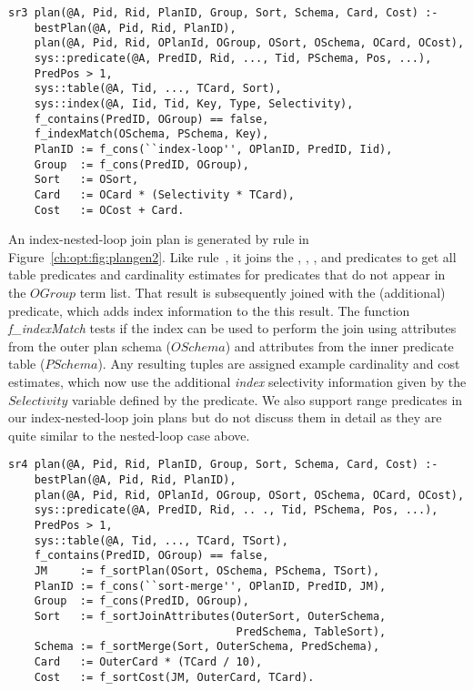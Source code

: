 \begin{figure*}
\ssp
\centering
\begin{lstlisting}
sr3 plan(@A, Pid, Rid, PlanID, Group, Sort, Schema, Card, Cost) :-
    bestPlan(@A, Pid, Rid, PlanID),
    plan(@A, Pid, Rid, OPlanId, OGroup, OSort, OSchema, OCard, OCost),
    sys::predicate(@A, PredID, Rid, ..., Tid, PSchema, Pos, ...),
    PredPos > 1,
    sys::table(@A, Tid, ..., TCard, Sort),
    sys::index(@A, Iid, Tid, Key, Type, Selectivity),
    f_contains(PredID, OGroup) == false,
    f_indexMatch(OSchema, PSchema, Key),
    PlanID := f_cons(``index-loop'', OPlanID, PredID, Iid),
    Group  := f_cons(PredID, OGroup),
    Sort   := OSort,
    Card   := OCard * (Selectivity * TCard),
    Cost   := OCost + Card.
\end{lstlisting}
\caption{\label{ch:opt:fig:plangen2}index-nested-loop join method.}
\end{figure*}

An index-nested-loop join plan is generated by rule  in
Figure~\ref{ch:opt:fig:plangen2}.  Like rule~, it joins the
, , , and  predicates
to get all table predicates and cardinality estimates for predicates that do
not appear in the $OGroup$ term list.  That result is subsequently joined with
the (additional)  predicate, which adds index information to the
this result.  The function {\em f\_indexMatch} tests if the index can be used
to perform the join using attributes from the outer plan schema ($OSchema$) and
attributes from the inner predicate table ($PSchema$).  Any resulting tuples
are assigned example cardinality and cost estimates, which now use the
additional {\em index} selectivity information given by the $Selectivity$
variable defined by the  predicate.  We also support range
predicates in our index-nested-loop join plans but do not discuss them in
detail as they are quite similar to the nested-loop case above.

\begin{figure*}
\ssp
\centering
\begin{lstlisting}
sr4 plan(@A, Pid, Rid, PlanID, Group, Sort, Schema, Card, Cost) :-
    bestPlan(@A, Pid, Rid, PlanID),
    plan(@A, Pid, Rid, OPlanId, OGroup, OSort, OSchema, OCard, OCost),
    sys::predicate(@A, PredID, Rid, .. ., Tid, PSchema, Pos, ...),
    PredPos > 1,
    sys::table(@A, Tid, ..., TCard, TSort),
    f_contains(PredID, OGroup) == false,
    JM     := f_sortPlan(OSort, OSchema, PSchema, TSort),
    PlanID := f_cons(``sort-merge'', OPlanID, PredID, JM),
    Group  := f_cons(PredID, OGroup),
    Sort   := f_sortJoinAttributes(OuterSort, OuterSchema, 
                                   PredSchema, TableSort),
    Schema := f_sortMerge(Sort, OuterSchema, PredSchema),
    Card   := OuterCard * (TCard / 10),
    Cost   := f_sortCost(JM, OuterCard, TCard).
\end{lstlisting}
\caption{\label{ch:opt:fig:plangen3}sort-merge join method.}
\end{figure*}

